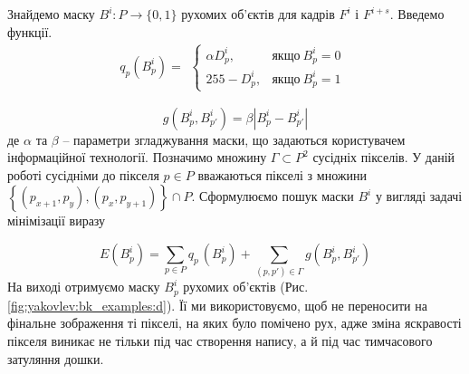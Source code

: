 Знайдемо маску $B^{i}:P \rightarrow \{0,1\}$ рухомих
об'єктів для кадрів \(F^{i}\) і \(F^{i + s}\).
Введемо функції.
\begin{equation*}
	q_{p}(B_{p}^{i}) =
	\begin{gathered}
		\begin{cases}
			\alpha D_{p}^{i}, & якщо\ B_{p}^{i} = 0 \\
			255 - D_{p}^{i},  & якщо\ B_{p}^{i} = 1 
		\end{cases}
	\end{gathered}
\end{equation*}

\begin{equation*}
	g(B_{p}^{i},B_{p'}^{i}) = \beta|B_{p}^{i} - B_{p'}^{i}|
\end{equation*}
де \(\alpha\) та \(\beta\) -- параметри згладжування маски, що задаються
користувачем інформаційної технології. Позначимо множину
$\Gamma \subset P^{2}$ сусідніх пікселів. У даній роботі сусідніми до
пікселя \(p \in P\) вважаються пікселі з множини
\(\left\{ \left( p_{x + 1},p_{y} \right),\left( p_{x},p_{y + 1} \right) \right\} \cap P\).
Сформулюємо пошук маски \(B^{i}\) у вигляді задачі мінімізації виразу

\begin{equation*}
	E\left( B_{p}^{i} \right) = \sum_{p \in P}^{}{q_{{p\ }}( B_{p}^{i}) +}\sum_{(p,p') \in \Gamma}^{}g(B_{p}^{i},B_{p'}^{i})
\end{equation*}
На виході отримуємо маску \(B_{p}^{i}\) рухомих об'єктів (Рис.
\ref{fig:yakovlev:bk_examples:d}).
Її ми використовуємо, щоб не переносити на фінальне зображення ті
пікселі, на яких було помічено рух, адже зміна яскравості пікселя
виникає не тільки під час створення напису, а й під час тимчасового
затуляння дошки.

